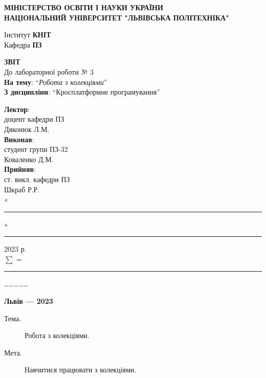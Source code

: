 \documentclass[14pt]{extreport}
\newcommand\subject{Кросплатформне програмування}
\newcommand\lecturer{доцент кафедри ПЗ\\Дяконюк Л.М.}
\newcommand\teacher{ст. викл. кафедри ПЗ\\Шкраб Р.Р.}
\newcommand\mygroup{ПЗ-32}
\newcommand\lab{3}
\newcommand\theme{Робота з колекціями}
\newcommand\purpose{Навчитися працювати з колекціями}
\begin{document}
\begin{normalsize}
	\begin{titlepage}
		\thispagestyle{empty}
		\begin{center}
			\textbf{МІНІСТЕРСТВО ОСВІТИ І НАУКИ УКРАЇНИ\\
				НАЦІОНАЛЬНИЙ УНІВЕРСИТЕТ "ЛЬВІВСЬКА ПОЛІТЕХНІКА"}
		\end{center}
		\begin{flushright}
			Інститут \textbf{КНІТ}\\
			Кафедра \textbf{ПЗ}
		\end{flushright}
		\vspace{160pt}
		\begin{center}
			\textbf{ЗВІТ}\\
			\vspace{10pt}
			До лабораторної роботи № \lab\\
			\textbf{На тему}: “\textit{\theme}”\\
			\textbf{З дисципліни}: “\subject”
		\end{center}
		\vspace{40pt}
		\begin{flushright}
			
			\textbf{Лектор}:\\
			\lecturer\\
			\vspace{10pt}
			\textbf{Виконав}:\\
			
			студент групи \mygroup\\
			Коваленко Д.М.\\
			\vspace{10pt}
			\textbf{Прийняв}:\\
			
			\teacher\\
			
			\vspace{28pt}
			«\rule{1cm}{0.15mm}» \rule{1.5cm}{0.15mm} 2023 р.\\
			$\sum$ = \rule{1cm}{0.15mm}……………\\
			
		\end{flushright}
		\vspace{\fill}
		\begin{center}
			\textbf{Львів — 2023}
		\end{center}
	\end{titlepage}
		
	\begin{description}
		\item[Тема.] \theme.
		\item[Мета.] \purpose.
	\end{description}
	


\end{normalsize}
\end{document}
